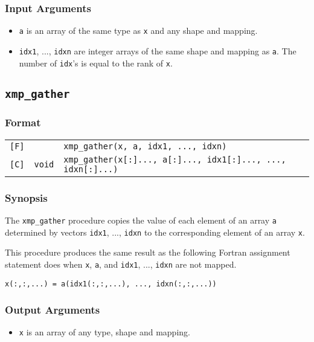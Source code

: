 \subsubsection*{Input Arguments}
\begin{itemize}
 \item {\tt a} is an array of the same type as {\tt x} and any shape
       and mapping.
 \item {\tt idx1}, ..., {\tt idxn} are integer arrays of the same
       shape and mapping as {\tt a}. The number of {\tt idx}'s is
       equal to the rank of {\tt x}.
\end{itemize}


\subsection{\tt xmp\_gather}

\subsubsection*{Format}

\begin{tabular}{lll}

\verb![F]!&            & {\tt xmp\_gather(x, a, idx1, ..., idxn)}\\

\verb![C]!& {\tt void} & {\tt xmp\_gather(x[:]..., a[:]..., idx1[:]..., ..., idxn[:]...)}\\

\end{tabular}

\subsubsection*{Synopsis}

The {\tt xmp\_gather} procedure copies the value of each element of
an array {\tt a} determined by vectors {\tt idx1}, ..., {\tt idxn}
to the corresponding element of an array {\tt x}.

This procedure produces the same result as the following Fortran
assignment statement does when {\tt x}, {\tt a}, and {\tt idx1}, ...,
{\tt idxn} are not mapped.

\begin{verbatim}
x(:,:,...) = a(idx1(:,:,...), ..., idxn(:,:,...))
\end{verbatim}

\subsubsection*{Output Arguments}
\begin{itemize}
 \item {\tt x} is an array of any type, shape and mapping.
\end{itemize}

